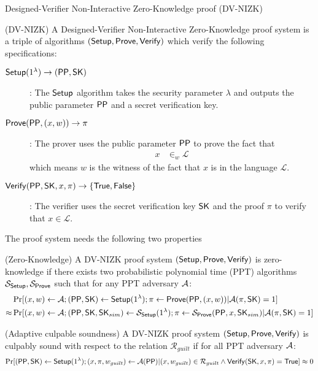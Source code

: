 \begin{subsection}{Designed-Verifier Non-Interactive Zero-Knowledge proof (DV-NIZK)}

  \begin{definition}{(DV-NIZK)} A Designed-Verifier Non-Interactive Zero-Knowledge proof system is a triple of algorithms $({\mathsf{Setup}}, {\mathsf{Prove}}, {\mathsf{Verify}})$ which verify the following specifications:
    \begin{description}
    \item[${\mathsf{Setup}}(1^\lambda) \to ({\mathsf{PP}}, \mathsf{SK})$]: The ${\mathsf{Setup}}$ algorithm takes the security parameter $\lambda$ and outputs the public parameter ${\mathsf{PP}}$ and a secret verification key.
    \item[${\mathsf{Prove}}({\mathsf{PP}}, (x, w)) \to \pi$]: The prover uses the public parameter ${\mathsf{PP}}$ to prove the fact that
      \begin{align*}
        x &\in_w \mathcal{L}
      \end{align*}
      which means $w$ is the witness of the fact that $x$ is in the language $\mathcal{L}$.
    \item[${\mathsf{Verify}}({\mathsf{PP}}, \mathsf{SK}, x, \pi) \to \{\mathsf{True}, \mathsf{False}\}$]: The verifier uses the secret verification key $\mathsf{SK}$ and the proof $\pi$ to verify that $x \in \mathcal{L}$. 
    \end{description}

    The proof system needs the following two properties

    \begin{property}{(Zero-Knowledge)}
      A DV-NIZK proof system $({\mathsf{Setup}}, {\mathsf{Prove}}, {\mathsf{Verify}})$ is zero-knowledge if there exists two probabilistic polynomial time (PPT) algorithms $\mathcal{S}_{{\mathsf{Setup}}}, \mathcal{S}_{{\mathsf{Prove}}}$ such that for any PPT adversary $\mathcal{A}$:
      \begin{align*}
        &\Pr[(x, w) \gets \mathcal{A}; ({\mathsf{PP}},\mathsf{SK}) \gets {\mathsf{Setup}}(1^\lambda); \pi \gets {\mathsf{Prove}}({\mathsf{PP}}, (x,w)) | \mathcal{A}(\pi, \mathsf{SK}) = 1]\\
        \approx &\Pr[(x, w) \gets \mathcal{A}; ({\mathsf{PP}},\mathsf{SK}, \mathsf{SK}_{sim}) \gets \mathcal{S}_{{\mathsf{Setup}}}(1^\lambda); \pi \gets \mathcal{S}_{{\mathsf{Prove}}}({\mathsf{PP}}, x, \mathsf{SK}_{sim}) | \mathcal{A}(\pi, \mathsf{SK}) = 1]
      \end{align*}
    \end{property}



    \begin{property}{(Adaptive culpable soundness)}
      A DV-NIZK proof system $({\mathsf{Setup}}, {\mathsf{Prove}}, {\mathsf{Verify}})$ is culpably sound with respect to the relation $\mathcal{R}_{guilt}$ if for all PPT adversary $\mathcal{A}$:
      \begin{align*}
        \Pr[({\mathsf{PP}}, \mathsf{SK}) \gets {\mathsf{Setup}}(1^{\lambda}); (x, \pi, w_{guilt}) \gets \mathcal{A}({\mathsf{PP}}) | (x, w_{guilt}) \in \mathcal{R}_{guilt} \wedge {\mathsf{Verify}}(\mathsf{SK}, x, \pi) = \mathsf{True}] \approx 0
      \end{align*}
    \end{property}

    
    
  \end{definition}


  
\end{subsection}
